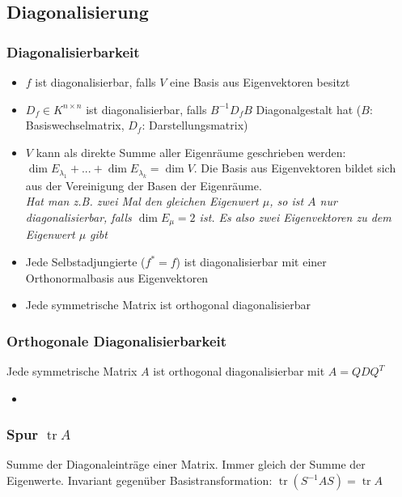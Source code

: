 \documentclass[german, fourcolumn, 8pt]{latex4ei/latex4ei_sheet}
\DeclareMathOperator{\tr}{tr}
\begin{document}
\subsection{Diagonalisierung}
\begin{sectionbox}
    \subsubsection{Diagonalisierbarkeit}
    \begin{itemize}
        \item $f$ ist diagonalisierbar, falls $V$ eine Basis aus Eigenvektoren besitzt
        \item $D_f \in K^{n\times n}$ ist diagonalisierbar, falls $B^{-1}D_fB$ Diagonalgestalt hat ($B$: Basiswechselmatrix, $D_f$: Darstellungsmatrix)
        \item $V$ kann als direkte Summe aller Eigenräume geschrieben werden: $\dim E_{\lambda_1} + ... + \dim E_{\lambda_k}=\dim V$. Die Basis aus Eigenvektoren bildet sich aus der Vereinigung der Basen der Eigenräume.\\
              \textit{Hat man z.B. zwei Mal den gleichen Eigenwert $\mu$, so ist $A$ nur diagonalisierbar, falls $\dim E_\mu=2$ ist. Es also zwei Eigenvektoren zu dem Eigenwert $\mu$ gibt}
        \item Jede Selbstadjungierte ($f^*=f$) ist diagonalisierbar mit einer Orthonormalbasis aus Eigenvektoren
        \item Jede symmetrische Matrix ist orthogonal diagonalisierbar
    \end{itemize}

    \subsubsection{Orthogonale Diagonalisierbarkeit}
    Jede symmetrische Matrix $A$ ist orthogonal diagonalisierbar mit $A=QDQ^T$
    \begin{itemize}
        \item
    \end{itemize}
\end{sectionbox}

\begin{sectionbox}
    \subsubsection{Spur $\tr A$}
    Summe der Diagonaleinträge einer Matrix. Immer gleich der Summe der Eigenwerte.
    Invariant gegenüber Basistransformation: $\tr (S^{-1}AS)=\tr A$
\end{sectionbox}
\end{document}
